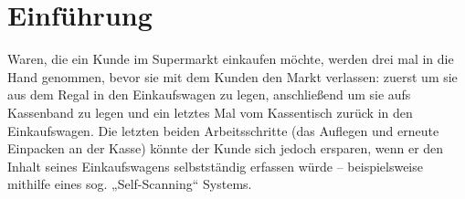 \seKurzfassung[]




%
%
%
%
\seInhaltsverzeichnis[%
einrueckung=ja,
gliederungsebenen=4
]




%
%
%
%






%
\chapter{Einführung}
Waren, die ein Kunde im Supermarkt einkaufen möchte, werden drei mal in die Hand genommen, bevor sie mit dem Kunden den Markt verlassen: zuerst um sie aus dem Regal in den Einkaufswagen zu legen, anschließend um sie aufs Kassenband zu legen und ein letztes Mal vom Kassentisch zurück in den Einkaufswagen. Die letzten beiden Arbeitsschritte (das Auflegen und erneute Einpacken an der Kasse) könnte der Kunde sich jedoch ersparen, wenn er den Inhalt seines Einkaufswagens selbstständig erfassen würde -- beispielsweise mithilfe eines sog. „Self-Scanning“ Systems.

